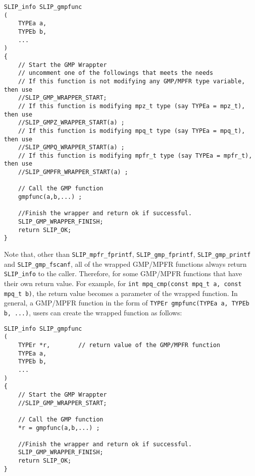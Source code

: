 \documentclass[12pt]{article}
\theoremstyle{definition}
\begin{document}
\begin{mdframed}[userdefinedwidth=6in]
{\footnotesize
\begin{verbatim}
SLIP_info SLIP_gmpfunc
(
    TYPEa a,
    TYPEb b,
    ...
)
{
    // Start the GMP Wrappter
    // uncomment one of the followings that meets the needs
    // If this function is not modifying any GMP/MPFR type variable, then use
    //SLIP_GMP_WRAPPER_START;
    // If this function is modifying mpz_t type (say TYPEa = mpz_t), then use
    //SLIP_GMPZ_WRAPPER_START(a) ;
    // If this function is modifying mpq_t type (say TYPEa = mpq_t), then use
    //SLIP_GMPQ_WRAPPER_START(a) ;
    // If this function is modifying mpfr_t type (say TYPEa = mpfr_t), then use
    //SLIP_GMPFR_WRAPPER_START(a) ;

    // Call the GMP function
    gmpfunc(a,b,...) ;

    //Finish the wrapper and return ok if successful.
    SLIP_GMP_WRAPPER_FINISH;
    return SLIP_OK;
}
\end{verbatim}
} \end{mdframed}

Note that, other than \verb|SLIP_mpfr_fprintf|, \verb|SLIP_gmp_fprintf|,
\verb|SLIP_gmp_printf| and \verb|SLIP_gmp_fscanf|, all of the wrapped GMP/MPFR
functions always return \verb|SLIP_info| to the caller. Therefore, for some
GMP/MPFR functions that have their own return value.  For example, for
\verb|int mpq_cmp(const mpq_t a, const mpq_t b)|, the return value becomes a
parameter of the wrapped function. In general, a GMP/MPFR function in the form
of \verb|TYPEr gmpfunc(TYPEa a, TYPEb b, ...)|, users can create the wrapped
function as follows:

\begin{mdframed}[userdefinedwidth=6in]
{\footnotesize
\begin{verbatim}
SLIP_info SLIP_gmpfunc
(
    TYPEr *r,        // return value of the GMP/MPFR function
    TYPEa a,
    TYPEb b,
    ...
)
{
    // Start the GMP Wrappter
    //SLIP_GMP_WRAPPER_START;

    // Call the GMP function
    *r = gmpfunc(a,b,...) ;

    //Finish the wrapper and return ok if successful.
    SLIP_GMP_WRAPPER_FINISH;
    return SLIP_OK;
}
\end{verbatim}
} \end{mdframed}
\end{document}
